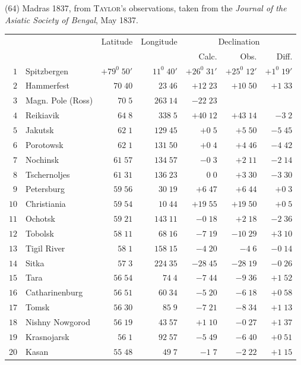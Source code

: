 (64) Madras 1837, from \textsc{Taylor}'s observations, taken from the \textit{Journal of the Asiatic Society of Bengal}, May 1837.
\clearpage
{}
\begingroup
\fontsize{9}{10.2}\selectfont
\setlength{\tabcolsep}{2.5pt}
\renewcommand{\arraystretch}{1.02}
\begin{center}
\begin{tabular}{rl|r|r||r|r|r}
\hline
&&Latitude&Longitude&\multicolumn{3}{c}{Declination}\\
&&&&Calc.&Obs.&Diff.\\\hline
$1$&Spitzbergen&$+79^0\;50'$&$11^0\;40'$&$+26^0\;31'$&$+25^0\;12'$&$+1^0\;19'$\\
$2$&Hammerfest&$70\;40$&$23\;46$&$+12\;23$&$+10\;50$&$+1\;33$\\
$3$&Magn. Pole (Ross)&$70\;5$&$263\;14$&$-22\;23$&&\\
$4$&Reikiavik&$64\;8$&$338\;5$&$+40\;12$&$+43\;14$&$-3\;2$\\
$5$&Jakutsk&$62\;1$&$129\;45$&$+0\;5$&$+5\;50$&$-5\;45$\\
$6$&Porotowsk&$62\;1$&$131\;50$&$+0\;4$&$+4\;46$&$-4\;42$\\
$7$&Nochinsk&$61\;57$&$134\;57$&$-0\;3$&$+2\;11$&$-2\;14$\\
$8$&Tschernoljes&$61\;31$&$136\;23$&$0\;0$&$+3\;30$&$-3\;30$\\
$9$&Petersburg&$59\;56$&$30\;19$&$+6\;47$&$+6\;44$&$+0\;3$\\
$10$&Christiania&$59\;54$&$10\;44$&$+19\;55$&$+19\;50$&$+0\;5$\\[2pt]
$11$&Ochotsk&$59\;21$&$143\;11$&$-0\;18$&$+2\;18$&$-2\;36$\\
$12$&Tobolsk&$58\;11$&$68\;16$&$-7\;19$&$-10\;29$&$+3\;10$\\
$13$&Tigil River&$58\;1$&$158\;15$&$-4\;20$&$-4\;6$&$-0\;14$\\
$14$&Sitka&$57\;3$&$224\;35$&$-28\;45$&$-28\;19$&$-0\;26$\\
$15$&Tara&$56\;54$&$74\;4$&$-7\;44$&$-9\;36$&$+1\;52$\\
$16$&Catharinenburg&$56\;51$&$60\;34$&$-5\;20$&$-6\;18$&$+0\;58$\\
$17$&Tomsk&$56\;30$&$85\;9$&$-7\;21$&$-8\;34$&$+1\;13$\\
$18$&Nishny Nowgorod&$56\;19$&$43\;57$&$+1\;10$&$-0\;27$&$+1\;37$\\
$19$&Krasnojarsk&$56\;1$&$92\;57$&$-5\;49$&$-6\;40$&$+0\;51$\\
$20$&Kasan&$55\;48$&$49\;7$&$-1\;7$&$-2\;22$&$+1\;15$\\[2pt]

\end{tabular}
\end{center}
